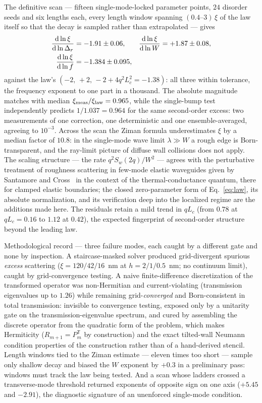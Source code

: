 \documentclass[aps,prl,preprint,superscriptaddress,longbibliography]{revtex4-2}
\begin{document}
The definitive scan --- fifteen single-mode-locked parameter points, $24$
disorder seeds and six lengths each, every length window spanning
$(0.4\text{--}3)\,\xi$ of the law itself so that the decay is sampled rather
than extrapolated --- gives
\begin{align}
\frac{{\rm d}\ln\xi}{{\rm d}\ln\Delta_r} &= -1.91 \pm 0.06, &
\frac{{\rm d}\ln\xi}{{\rm d}\ln W} &= +1.87 \pm 0.08,\nonumber\\
\frac{{\rm d}\ln\xi}{{\rm d}\ln f} &= -1.384 \pm 0.095,
\end{align}
against the law's $(-2,\,+2,\,-2+4q^2L_c^2 = -1.38)$: all three within
tolerance, the frequency exponent to one part in a thousand. The absolute
magnitude matches with median $\xi_{\rm meas}/\xi_{\rm law} = 0.965$, while
the single-bump test independently predicts $1/1.037 = 0.964$ for the same
second-order excess: two measurements of one correction, one deterministic
and one ensemble-averaged, agreeing to $10^{-3}$. Across the scan the Ziman
formula underestimates $\xi$ by a median factor of $10.8$: in the single-mode
wave limit $\lambda \gg W$ a rough edge is Born-transparent, and the
ray-limit picture of diffuse wall collisions does not apply. The scaling
structure --- the rate $q^2 S_w(2q)/W^2$ --- agrees with the perturbative
treatment of roughness scattering in few-mode elastic waveguides given by
Santamore and Cross~\cite{santamore2001} in the context of the
thermal-conductance quantum, there for clamped elastic boundaries; the
closed zero-parameter form of Eq.~\eqref{eq:law}, its absolute
normalization, and its verification deep into the localized regime are the
additions made here. The residuals
retain a mild trend in $qL_c$ (from $0.78$ at $qL_c = 0.16$ to $1.12$ at
$0.42$), the expected fingerprint of second-order structure beyond the
leading law.

Methodological record --- three failure modes, each caught by a different
gate and none by inspection. A staircase-masked solver produced
grid-divergent spurious \emph{excess} scattering ($\xi = 120/42/16$~nm at
$h = 2/1/0.5$~nm; no continuum limit), caught by grid-convergence testing. A
naive finite-difference discretization of the transformed operator was
non-Hermitian and current-violating (transmission eigenvalues up to $1.26$)
while remaining grid-\emph{converged} and Born-consistent in total
transmission: invisible to convergence testing, exposed only by a unitarity
gate on the transmission-eigenvalue spectrum, and cured by assembling the
discrete operator from the quadratic form of the problem, which makes
Hermiticity ($R_{m+1} = P_m^{\mathsf T}$ by construction) and the exact
tilted-wall Neumann condition properties of the construction rather than of
a hand-derived stencil. Length windows tied to the Ziman estimate --- eleven
times too short --- sample only shallow decay and biased the $W$ exponent by
$+0.3$ in a preliminary pass: windows must track the law being tested. And a
scan whose ladders crossed a transverse-mode threshold returned exponents of
opposite sign on one axis ($+5.45$ and $-2.91$), the diagnostic signature of
an unenforced single-mode condition. 
\end{document}
